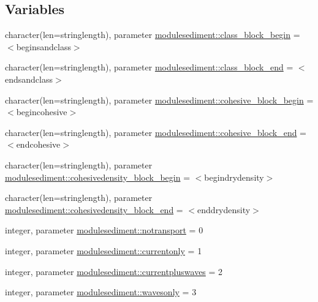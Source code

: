 \subsection*{Variables}
\begin{DoxyCompactItemize}
\item 
character(len=stringlength), parameter \mbox{\hyperlink{namespacemodulesediment_af1006e09404ecf1262d3fe43df71f09c}{modulesediment\+::class\+\_\+block\+\_\+begin}} = \textquotesingle{}$<$beginsandclass$>$\textquotesingle{}
\item 
character(len=stringlength), parameter \mbox{\hyperlink{namespacemodulesediment_aeb889ae6f0f7e8a1b9c13869a959bd1b}{modulesediment\+::class\+\_\+block\+\_\+end}} = \textquotesingle{}$<$endsandclass$>$\textquotesingle{}
\item 
character(len=stringlength), parameter \mbox{\hyperlink{namespacemodulesediment_a97728c336ac59fb7fa2d88989aa0f05a}{modulesediment\+::cohesive\+\_\+block\+\_\+begin}} = \textquotesingle{}$<$begincohesive$>$\textquotesingle{}
\item 
character(len=stringlength), parameter \mbox{\hyperlink{namespacemodulesediment_a6483adc6b7baa8b84f61b08324b816c6}{modulesediment\+::cohesive\+\_\+block\+\_\+end}} = \textquotesingle{}$<$endcohesive$>$\textquotesingle{}
\item 
character(len=stringlength), parameter \mbox{\hyperlink{namespacemodulesediment_a8d61754f94665f221210ebc1bd20e115}{modulesediment\+::cohesivedensity\+\_\+block\+\_\+begin}} = \textquotesingle{}$<$begindrydensity$>$\textquotesingle{}
\item 
character(len=stringlength), parameter \mbox{\hyperlink{namespacemodulesediment_ac4c06599ecc092000b8f90f8c4eb9f07}{modulesediment\+::cohesivedensity\+\_\+block\+\_\+end}} = \textquotesingle{}$<$enddrydensity$>$\textquotesingle{}
\item 
integer, parameter \mbox{\hyperlink{namespacemodulesediment_aaf552a5be9caf9b6291f624b0a24fb3a}{modulesediment\+::notransport}} = 0
\item 
integer, parameter \mbox{\hyperlink{namespacemodulesediment_a3f144798ab083396919e5839e34e0bf8}{modulesediment\+::currentonly}} = 1
\item 
integer, parameter \mbox{\hyperlink{namespacemodulesediment_a1bd4574819c8845169f3b29052ce4e60}{modulesediment\+::currentpluswaves}} = 2
\item 
integer, parameter \mbox{\hyperlink{namespacemodulesediment_ac5c33200eb0ff8772d6e61ec1a22ce5e}{modulesediment\+::wavesonly}} = 3
\item 

\end{DoxyCompactItemize}
